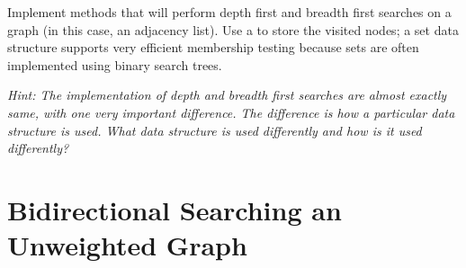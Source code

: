 \begin{problem}
Implement methods that will perform depth first and breadth first searches on a graph (in this case, an adjacency list).
Use a  to store the visited nodes;
a set data structure supports very efficient membership testing because
sets are often implemented using binary search trees.

\textit{Hint: The implementation of depth and breadth first searches are almost exactly same, with one very important difference.
The difference is how a particular data structure is used.  What data structure is used differently and how is it used differently?}
\end{problem}

\section*{Bidirectional Searching an Unweighted Graph}

